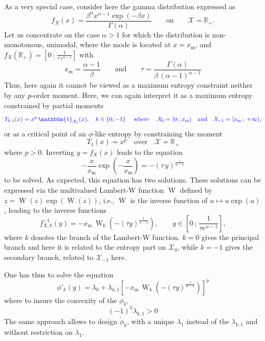 \documentclass[entropy,article,submit,moreauthors,pdftex]{Definitions/mdpi}
\newcommand{\SZ}[1]{{\color{blue} #1}}                                       %
\def\Rset{\mathbb{R}}%
\def\X{\mathcal{X}}%
\def\un{\mathbbm{1}}%
\def\W{\operatorname{W}} %
\begin{document}
As a very special case, consider here the gamma distribution expressed as
%
\[
f_X(x) = \frac{\beta^\alpha  x^{\alpha-1} \exp(-\beta x)}{\Gamma(\alpha)} \qquad
\mbox{on} \qquad \X = \Rset_+.
\]
%
Let  us concentrate  on the  case $\alpha  > 1$  for which  the distribution  is
non-monotonous, unimodal, where the mode is located at $x = x_{\mathrm{m}}$, and
$f_X(\Rset_+) = \left[ 0 \, ; \, \frac1{\tau \,e^{\alpha-1}} \right]$ with
%
\[
x_{\mathrm{m}}  =   \frac{\alpha-1}{\beta}  \qquad  \mbox{and}  \qquad   \tau  =
\frac{\Gamma(\alpha)}{\beta \, (\alpha-1)^{\alpha-1}}
\]
%
Thus, here again it cannot be viewed  as a maximum entropy constraint neither by
any $p$-order  moment.  Here,  we can  again interpret it  as a  maximum entropy
constrained by partial moments
%
\[
\SZ{T_{k,1}(x)  =  x^p \,  \un_{\X_k}(x),  \quad  k \in  \{  0  , -1  \}  \quad
  \mbox{ where } \quad  \X_0 =  [ 0  \, ; \,  x_{\mathrm{m}} )  \quad \mbox{and}
    \quad \X_{-1} = [ x_{\mathrm{m}} \, ; \: +\infty ),}
\]
%
or as \SZ{a critical point of an $\phi$-like entropy by constraining} the moment 
%
\[
T_1(x) = x^p \quad \mbox{over} \quad \X = \Rset_+
\]
%
where $p > 0$. Inverting $y = f_X(x)$ leads to the equation
%
\[
- \frac{x}{x_{\mathrm{m}}}  \exp\left( -  \frac{x}{x_{\mathrm{m}}}  \right) =  -
(\tau \, y )^{\frac{1}{\alpha - 1}}
\]
%
to be solved. As expected, this  equation has two solutions. These solutions can
be  expressed   via  the   multivalued  Lambert-W   function  $\W$   defined  by
$z=\W(z)\exp(\W(z))$,  i.e., $\W$  is  the  inverse function  of  $u \mapsto  u
\exp(u)$\cite[\S~1]{CorGon96}, leading to the inverse functions
%
\[
f_{X,k}^{-1}(y) = -  x_{\mathrm{m}} \, \W_k\left( -  (\tau y)^{\frac{1}{\alpha -
    1}} \right),  \qquad y \in  \left[ 0 \, ;  \, \frac{1}{\tau e^{\alpha  - 1}}
  \right],
\]
%
where  $k$  denotes the  branch  of  the  Lambert-W  function. $k=0$  gives  the
principal branch and here it is related  to the entropy part on $\X_0$, while $k
= -1$ gives the secondary branch, related to $\X_{-1}$ here.


One has thus to solve the equation
%
\[
\phi'_k(y) =  \lambda_0 +  \lambda_{k,1} \left[ - x_{\mathrm{m}} \, \W_k\left(  - (\tau
  y)^{\frac{1}{\alpha - 1}} \right) \right]^p
\]
%
where to insure the convexity of the $\phi_k$,
%
\[
(-1)^k \lambda_{k,1} > 0
\]
%
The  same  approach  allows  to   design  $\widetilde{\phi}_k$,  with  a  unique
$\lambda_1$  instead  of  the  $\lambda_{k,1}$ \SZ{and  without  restriction  on
  $\lambda_1$}.
\end{document}

